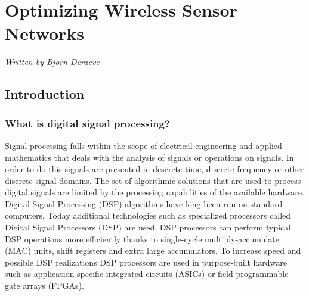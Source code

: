 
\chapter{Optimizing Wireless Sensor Networks} %
\label{Chapter5} %
\textsf{\textsl{Written by Bjorn Deraeve}}
\section{Introduction}
\subsection{What is digital signal processing?}
Signal processing falls within the scope of electrical engineering and applied mathematics that deals with the analysis of signals or operations on signals. In order to do this signals are presented in descrete time, discrete frequency or other discrete signal domains. The set of algorithmic solutions that are used to process digital signals are limited by the processing capabilities of the available hardware. 
Digital Signal Processing (DSP) algorithms have long been run on standard computers. Today additional technologies such as specialized processors called Digital Signal Processors (DSP) are used. DSP processors can  perform typical DSP operations more efficiently thanks to single-cycle multiply-accumulate (MAC) units, shift registers and extra large accumulators. To increase speed and possible DSP realizations DSP processors are used in purpose-built hardware such as application-specific integrated circuits (ASICs) or field-programmable gate arrays (FPGAs).


